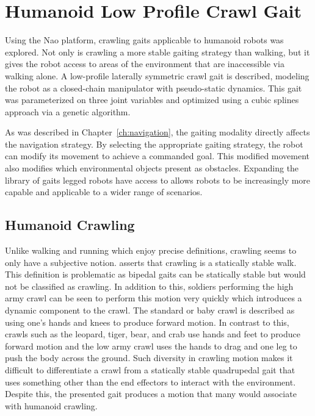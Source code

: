 
\chapter{Humanoid Low Profile Crawl Gait} \label{ch:crawl_gait}

Using the Nao platform, crawling gaits applicable to humanoid robots was explored. 
Not only is crawling a more stable gaiting strategy than walking, but it gives the robot access to areas
of the environment that are inaccessible via walking alone. A low-profile laterally symmetric crawl gait is described, 
modeling the robot as a closed-chain manipulator with pseudo-static dynamics. This gait was parameterized on 
three joint variables and optimized using a cubic splines approach via a genetic algorithm.

As was described in Chapter~\ref{ch:navigation}, the gaiting modality directly affects the navigation strategy.
By selecting the appropriate gaiting strategy, the robot can modify its movement to achieve a commanded goal.
This modified movement also modifies which environmental objects present as obstacles.
Expanding the library of gaits legged robots have access to allows robots to be increasingly more capable
and applicable to a wider range of scenarios.

\section{Humanoid Crawling}

Unlike walking and running which enjoy precise definitions, crawling seems to only have a subjective notion.
\cite{Dudek2000} asserts that crawling is a statically stable walk. This definition is problematic
as bipedal gaits can be statically stable but would not
be classified as crawling. In addition to this, soldiers performing the high army crawl \cite{armyfieldmanual2008} can be seen to
perform this motion very quickly which introduces a dynamic component to the crawl.
The standard or baby crawl is described as using one's hands and knees to produce forward motion.
In contrast to this, crawls such as the leopard, tiger, bear, and crab use hands and feet to produce
forward motion and the low army crawl uses the hands to drag and one leg to push the body across the ground.
Such diversity in crawling motion makes it difficult to differentiate a crawl from a statically stable
quadrupedal gait that uses something other than the end effectors to interact with the environment.
Despite this, the presented gait produces a motion that many would associate with humanoid crawling.

